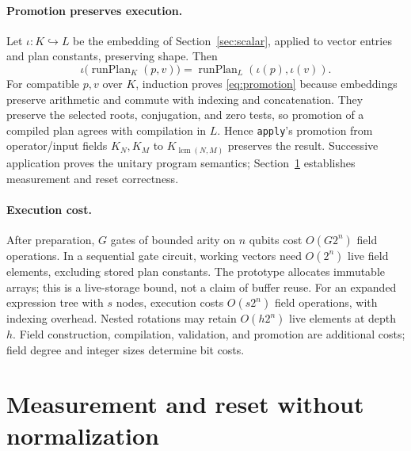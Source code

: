 \documentclass[11pt,a4paper]{article}
\newcommand{\code}[1]{\texttt{#1}}
\DeclareMathOperator{\lcm}{lcm}
\begin{document}
\paragraph{Promotion preserves execution.}
Let $\iota:K\hookrightarrow L$ be the embedding of Section~\ref{sec:scalar},
applied to vector entries and plan constants, preserving shape. Then
\begin{equation}
\iota\bigl(\operatorname{runPlan}_K(p,v)\bigr)
=\operatorname{runPlan}_L(\iota(p),\iota(v)).
\label{eq:promotion}
\end{equation}
For compatible $p,v$ over $K$, induction proves \eqref{eq:promotion} because
embeddings preserve arithmetic and commute with indexing and concatenation.
They preserve the selected roots, conjugation, and zero tests, so promotion
of a compiled plan agrees with compilation in $L$. Hence \code{apply}'s
promotion from operator/input fields $K_N,K_M$ to $K_{\lcm(N,M)}$ preserves
the result. Successive application proves the unitary program semantics;
Section~\ref{sec:measurement} establishes measurement and reset correctness.

\paragraph{Execution cost.}
After preparation, $G$ gates of bounded arity on $n$ qubits cost
$O(G2^n)$ field operations. In a sequential gate circuit, working vectors
need $O(2^n)$ live field elements, excluding stored plan constants.
The prototype allocates immutable arrays; this is a live-storage bound,
not a claim of buffer reuse. For an expanded expression tree with $s$
nodes, execution costs $O(s2^n)$ field operations, with indexing overhead.
Nested rotations may retain $O(h2^n)$ live elements at depth $h$.
Field construction, compilation, validation, and promotion are additional
costs; field degree and integer sizes determine bit costs.

\section{Measurement and reset without normalization}
\label{sec:measurement}
\end{document}
